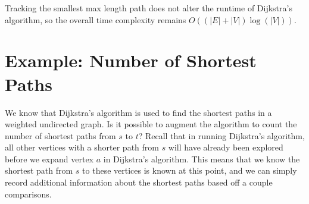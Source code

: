 \documentclass[11pt]{article}
\begin{document}
\IncMargin{2em}
\begin{algorithm}[H]
    \footnotesize
    \DontPrintSemicolon
    \BlankLine
\end{algorithm}\DecMargin{2em} 

Tracking the smallest max length path does not alter the runtime of Dijkstra's algorithm, so the overall time complexity remains $O((|E| + |V|) \log(|V|))$.

\section{Example: Number of Shortest Paths}
We know that Dijkstra's algorithm is used to find the shortest paths in a weighted undirected graph. Is it possible to augment the algorithm to count the number of shortest paths from $s$ to $t$? Recall that in running Dijkstra's algorithm, all other vertices with a shorter path from $s$ will have already been explored before we expand vertex $a$ in Dijkstra's algorithm. This means that we know the shortest path from $s$ to these vertices is known at this point, and we can simply record additional information about the shortest paths based off a couple comparisons.
\end{document}
